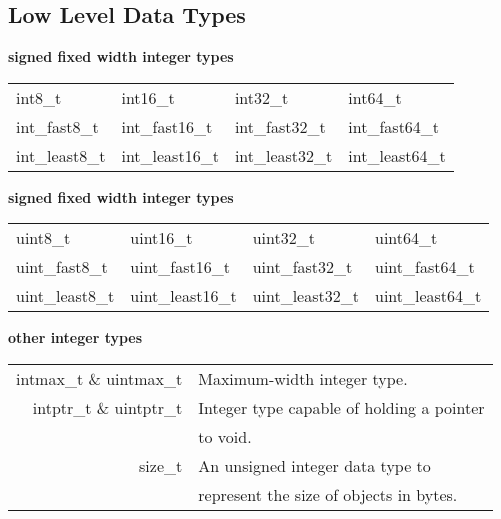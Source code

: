 \documentclass[5pt]{article}
\begin{document}
\begin{multicols}{2}
\subsection{Low Level Data Types}
\textbf{signed fixed width integer types}\\
\begin{tabular}{>{\ttfamily}l >{\ttfamily}l >{\ttfamily}l >{\ttfamily}l}
int8\_t         & int16\_t          & int32\_t          & int64\_t          \\
int\_fast8\_t   & int\_fast16\_t    & int\_fast32\_t    & int\_fast64\_t    \\
int\_least8\_t  & int\_least16\_t   & int\_least32\_t   & int\_least64\_t   \\
\end{tabular}
\textbf{signed fixed width integer types}\\
\begin{tabular}{>{\ttfamily}l >{\ttfamily}l >{\ttfamily}l >{\ttfamily}l}
uint8\_t        & uint16\_t         & uint32\_t         & uint64\_t         \\
uint\_fast8\_t  & uint\_fast16\_t   & uint\_fast32\_t   & uint\_fast64\_t   \\
uint\_least8\_t & uint\_least16\_t  & uint\_least32\_t  & uint\_least64\_t  \\
\end{tabular}
\textbf{other integer types}\\
\begin{tabular}{>{\ttfamily}r l}
    intmax\_t \& uintmax\_t & Maximum-width integer type.\\
    intptr\_t \& uintptr\_t & Integer type capable of holding a pointer\\
                            & to void.\\
    size\_t & An unsigned integer data type to\\
            & represent the size of objects in bytes.\\    
\end{tabular}
\end{multicols}
\end{document}
